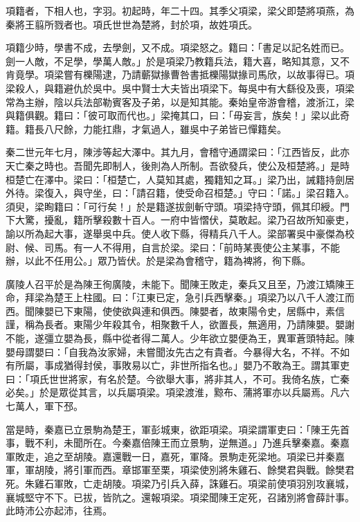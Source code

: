 
\begin{pinyinscope}
項籍者，下相人也，字羽。初起時，年二十四。其季父項梁，梁父即楚將項燕，為秦將王翦所戮者也。項氏世世為楚將，封於項，故姓項氏。

項籍少時，學書不成，去學劍，又不成。項梁怒之。籍曰：「書足以記名姓而已。劍一人敵，不足學，學萬人敵。」於是項梁乃教籍兵法，籍大喜，略知其意，又不肯竟學。項梁嘗有櫟陽逮，乃請蘄獄掾曹咎書抵櫟陽獄掾司馬欣，以故事得已。項梁殺人，與籍避仇於吳中。吳中賢士大夫皆出項梁下。每吳中有大繇役及喪，項梁常為主辦，陰以兵法部勒賓客及子弟，以是知其能。秦始皇帝游會稽，渡浙江，梁與籍俱觀。籍曰：「彼可取而代也。」梁掩其口，曰：「毋妄言，族矣！」梁以此奇籍。籍長八尺餘，力能扛鼎，才氣過人，雖吳中子弟皆已憚籍矣。

秦二世元年七月，陳涉等起大澤中。其九月，會稽守通謂梁曰：「江西皆反，此亦天亡秦之時也。吾聞先即制人，後則為人所制。吾欲發兵，使公及桓楚將。」是時桓楚亡在澤中。梁曰：「桓楚亡，人莫知其處，獨籍知之耳。」梁乃出，誡籍持劍居外待。梁復入，與守坐，曰：「請召籍，使受命召桓楚。」守曰：「諾。」梁召籍入。須臾，梁眴籍曰：「可行矣！」於是籍遂拔劍斬守頭。項梁持守頭，佩其印綬。門下大驚，擾亂，籍所擊殺數十百人。一府中皆慴伏，莫敢起。梁乃召故所知豪吏，諭以所為起大事，遂舉吳中兵。使人收下縣，得精兵八千人。梁部署吳中豪傑為校尉、候、司馬。有一人不得用，自言於梁。梁曰：「前時某喪使公主某事，不能辦，以此不任用公。」眾乃皆伏。於是梁為會稽守，籍為裨將，徇下縣。

廣陵人召平於是為陳王徇廣陵，未能下。聞陳王敗走，秦兵又且至，乃渡江矯陳王命，拜梁為楚王上柱國。曰：「江東已定，急引兵西擊秦。」項梁乃以八千人渡江而西。聞陳嬰已下東陽，使使欲與連和俱西。陳嬰者，故東陽令史，居縣中，素信謹，稱為長者。東陽少年殺其令，相聚數千人，欲置長，無適用，乃請陳嬰。嬰謝不能，遂彊立嬰為長，縣中從者得二萬人。少年欲立嬰便為王，異軍蒼頭特起。陳嬰母謂嬰曰：「自我為汝家婦，未嘗聞汝先古之有貴者。今暴得大名，不祥。不如有所屬，事成猶得封侯，事敗易以亡，非世所指名也。」嬰乃不敢為王。謂其軍吏曰：「項氏世世將家，有名於楚。今欲舉大事，將非其人，不可。我倚名族，亡秦必矣。」於是眾從其言，以兵屬項梁。項梁渡淮，黥布、蒲將軍亦以兵屬焉。凡六七萬人，軍下邳。

當是時，秦嘉已立景駒為楚王，軍彭城東，欲距項梁。項梁謂軍吏曰：「陳王先首事，戰不利，未聞所在。今秦嘉倍陳王而立景駒，逆無道。」乃進兵擊秦嘉。秦嘉軍敗走，追之至胡陵。嘉還戰一日，嘉死，軍降。景駒走死梁地。項梁已并秦嘉軍，軍胡陵，將引軍而西。章邯軍至栗，項梁使別將朱雞石、餘樊君與戰。餘樊君死。朱雞石軍敗，亡走胡陵。項梁乃引兵入薛，誅雞石。項梁前使項羽別攻襄城，襄城堅守不下。已拔，皆阬之。還報項梁。項梁聞陳王定死，召諸別將會薛計事。此時沛公亦起沛，往焉。


\end{pinyinscope}
